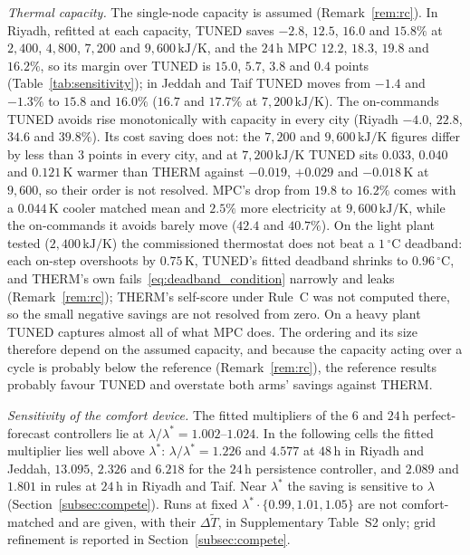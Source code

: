 \documentclass[3p,twocolumn,number]{elsarticle}
\begin{document}
\emph{Thermal capacity.} The single-node capacity is assumed (Remark~\ref{rem:rc}). In Riyadh, refitted at each capacity, TUNED saves $-2.8$, $12.5$, $16.0$ and $15.8\%$ at $2{,}400$, $4{,}800$, $7{,}200$ and $9{,}600\,\text{kJ/K}$, and the $24\,$h MPC $12.2$, $18.3$, $19.8$ and $16.2\%$, so its margin over TUNED is $15.0$, $5.7$, $3.8$ and $0.4$ points (Table~\ref{tab:sensitivity}); in Jeddah and Taif TUNED moves from $-1.4$ and $-1.3\%$ to $15.8$ and $16.0\%$ ($16.7$ and $17.7\%$ at $7{,}200\,\text{kJ/K}$). The on-commands TUNED avoids rise monotonically with capacity in every city (Riyadh $-4.0$, $22.8$, $34.6$ and $39.8\%$). Its cost saving does not: the $7{,}200$ and $9{,}600\,\text{kJ/K}$ figures differ by less than $3$ points in every city, and at $7{,}200\,\text{kJ/K}$ TUNED sits $0.033$, $0.040$ and $0.121\,$K warmer than THERM against $-0.019$, $+0.029$ and $-0.018\,$K at $9{,}600$, so their order is not resolved. MPC's drop from $19.8$ to $16.2\%$ comes with a $0.044\,$K cooler matched mean and $2.5\%$ more electricity at $9{,}600\,\text{kJ/K}$, while the on-commands it avoids barely move ($42.4$ and $40.7\%$). On the light plant tested ($2{,}400\,\text{kJ/K}$) the commissioned thermostat does not beat a $1\,^\circ$C deadband: each on-step overshoots by $0.75\,$K, TUNED's fitted deadband shrinks to $0.96\,^\circ$C, and THERM's own fails~\eqref{eq:deadband_condition} narrowly and leaks (Remark~\ref{rem:rc}); THERM's self-score under Rule~C was not computed there, so the small negative savings are not resolved from zero. On a heavy plant TUNED captures almost all of what MPC does. The ordering and its size therefore depend on the assumed capacity, and because the capacity acting over a cycle is probably below the reference (Remark~\ref{rem:rc}), the reference results probably favour TUNED and overstate both arms' savings against THERM.

\emph{Sensitivity of the comfort device.} The fitted multipliers of the $6$ and $24\,$h perfect-forecast controllers lie at $\lambda/\lambda^\ast=1.002$--$1.024$. In the following cells the fitted multiplier lies well above $\lambda^\ast$: $\lambda/\lambda^\ast=1.226$ and $4.577$ at $48\,$h in Riyadh and Jeddah, $13.095$, $2.326$ and $6.218$ for the $24\,$h persistence controller, and $2.089$ and $1.801$ in rules at $24\,$h in Riyadh and Taif. Near $\lambda^\ast$ the saving is sensitive to $\lambda$ (Section~\ref{subsec:compete}). Runs at fixed $\lambda^\ast\cdot\{0.99,1.01,1.05\}$ are not comfort-matched and are given, with their $\Delta\tilde T$, in Supplementary Table~S2 only; grid refinement is reported in Section~\ref{subsec:compete}.
\end{document}
